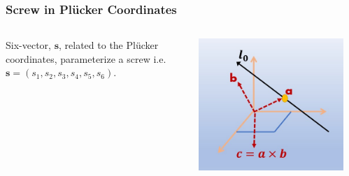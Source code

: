 \begin{frame}
	\frametitle{Screw in Pl{\"u}cker Coordinates}
	\begin{columns}[b]
		\begin{column}{.67\columnwidth}
			\centering
			\begin{definition}
				Six-vector, $\bm{s}$, related to the Pl{\"u}cker coordinates, parameterize a screw i.e. $\bm{s}=\left(s_1, s_2, s_3, s_4, s_5, s_6\right)$.
			\end{definition}
		\end{column}
		
		\begin{column}{.3\columnwidth}
			\centering
			\includegraphics[width=\textwidth]{figures/plucker_coords.jpg}
		\end{column}
		\label{fig:plucker}
	\end{columns}
\end{frame}



